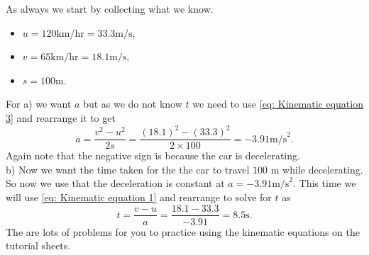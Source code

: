 As always we start by collecting what we know.
\begin{itemize}
\setlength{\itemsep}{-5pt}
    \item $u=120\text{km/hr}=33.3\text{m/s}$,
    \item $v=65\text{km/hr}=18.1\text{m/s}$,
    \item $s=100\text{m}$.
\end{itemize}

For a) we want $a$ but as we do not know $t$ we need to use \cref{eq: Kinematic equation 3} and rearrange it to get
\begin{equation*}
    a=\frac{v^{2}-u^{2}}{2s}=\frac{(18.1)^{2}-(33.3)^{2}}{2\times 100}=-3.91\text{m/s}^{2}.
\end{equation*}
Again note that the negative sign is because the car is decelerating.\\

b) Now we want the time taken for the the car to travel $100$ m while decelerating. So now we use that the deceleration is constant at $a=-3.91\text{m/s}^{2}$. This time we will use \cref{eq: Kinematic equation 1} and rearrange to solve for $t$ as
\begin{equation*}
    t=\frac{v-u}{a}=\frac{18.1-33.3}{-3.91}=8.5 \text{s}.
\end{equation*}
The are lots of problems for you to practice using the kinematic equations on the tutorial sheets.